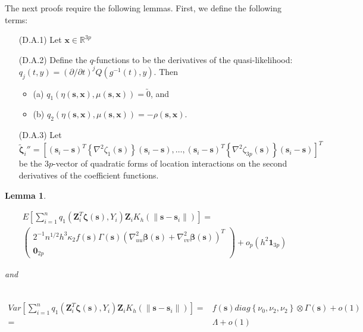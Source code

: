 \documentclass[authoryear,review, 12pt]{elsarticle}
\newtheorem{lem}{Lemma}
\begin{document}
The next proofs require the following lemmas. First, we define the
following terms:
\begin{itemize}
\item[(D.A.1)] Let $\bm{x}\in\mathbb{R}^{3p}$
\item[(D.A.2)] Define the $q$-functions to be the derivatives of the quasi-likelihood:
$q_{j}(t,y)=\left(\partial/\partial t\right)^{j}Q\left(g^{-1}\left(t\right),y\right)$.
Then

\begin{itemize}
\item (a) $q_{1}\left(\eta\left(\bm{s},\bm{x}\right),\mu\left(\bm{s},\bm{x}\right)\right)=\utilde{0}$,
and 
\item (b) $q_{2}\left(\eta\left(\bm{s},\bm{x}\right),\mu\left(\bm{s},\bm{x}\right)\right)=-\rho\left(\bm{s},\bm{x}\right)$.
\end{itemize}
\item[(D.A.3)] Let $\tilde{\bm{\zeta}}_{i}''=\left[\left(\bm{s}_{i}-\bm{s}\right)^{T}\left\{ \nabla^{2}\zeta_{1}\left(\bm{s}\right)\right\} \left(\bm{s}_{i}-\bm{s}\right),\dots,\left(\bm{s}_{i}-\bm{s}\right)^{T}\left\{ \nabla^{2}\zeta_{3p}\left(\bm{s}\right)\right\} \left(\bm{s}_{i}-\bm{s}\right)\right]^{T}$
be the $3p$-vector of quadratic forms of location interactions on
the second derivatives of the coefficient functions.\end{itemize}
\begin{lem}
\label{lemma:omega}

\begin{multline*}
E\left[\sum_{i=1}^{n}q_{1}\left(\bm{Z}_{i}^{T}\bm{\zeta}\left(\bm{s}\right),Y_{i}\right)\bm{Z}_{i}K_{h}\left(\|\bm{s}-\bm{s}_{i}\|\right)\right]=\\
\left(\begin{array}{c}
2^{-1}n^{1/2}h^{3}\kappa_{2}f\left(\bm{s}\right)\Gamma\left(\bm{s}\right)\left(\nabla_{uu}^{2}\bm{\beta}\left(\bm{s}\right)+\nabla_{vv}^{2}\bm{\beta}\left(\bm{s}\right)\right)^{T}\\
\bm{0}_{2p}
\end{array}\right)+o_{p}\left(h^{2}\bm{1}_{3p}\right)
\end{multline*}


and 

\begin{align*}
\end{align*}


\begin{align*}
Var\left[\sum_{i=1}^{n}q_{1}\left(\bm{Z}_{i}^{T}\bm{\zeta}\left(\bm{s}\right),Y_{i}\right)\bm{Z}_{i}K_{h}\left(\|\bm{s}-\bm{s}_{i}\|\right)\right]= & f\left(\bm{s}\right)diag\left\{ \nu_{0},\nu_{2},\nu_{2}\right\} \otimes\Gamma\left(\bm{s}\right)+o\left(1\right)\\
= & \Lambda+o\left(1\right)
\end{align*}

\end{lem}
\end{document}

